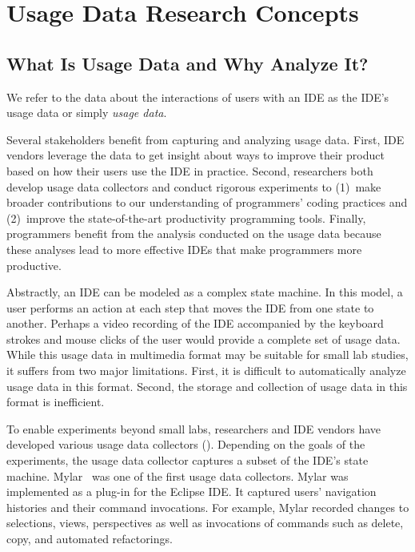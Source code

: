 \section{Usage Data Research Concepts}

\subsection{What Is Usage Data and Why Analyze It?}

We refer to the data about the interactions of users with an IDE as the IDE's
usage data or simply \emph{usage data}.

%
Several stakeholders benefit from capturing and analyzing usage data. First, IDE
vendors leverage the data to get insight about ways to improve their product
based on how their users use the IDE in practice. Second, researchers both
develop usage data collectors and conduct rigorous experiments to (1)~make
broader contributions to our understanding of programmers' coding practices and
(2)~improve the state-of-the-art productivity programming tools. Finally,
programmers benefit from the analysis conducted on the usage data because these
analyses lead to more effective IDEs that make programmers more productive.

Abstractly, an IDE can be modeled as a complex state machine. In this model, a
user performs an action at each step that moves the IDE from one state to
another.
%
Perhaps a video recording of the IDE accompanied by the keyboard strokes and
mouse clicks of the user would provide a complete set of usage data.
%
While this usage data in multimedia format may be suitable for small lab
studies, it suffers from two major limitations. First, it is difficult to
automatically analyze usage data in this format. Second, the storage and
collection of usage data in this format is inefficient.

To enable experiments beyond small labs, researchers and IDE vendors have
developed various usage data collectors ().
Depending on the goals of the experiments, the usage data collector captures a
subset of the IDE's state machine.
%
Mylar~\cite{V:Murphy2006How} was one of the first usage data collectors. Mylar
was implemented as a plug-in for the Eclipse IDE. It captured users' navigation
histories and their command invocations. For example, Mylar recorded changes to
selections, views, perspectives as well as invocations of commands such as
delete, copy, and automated refactorings.

